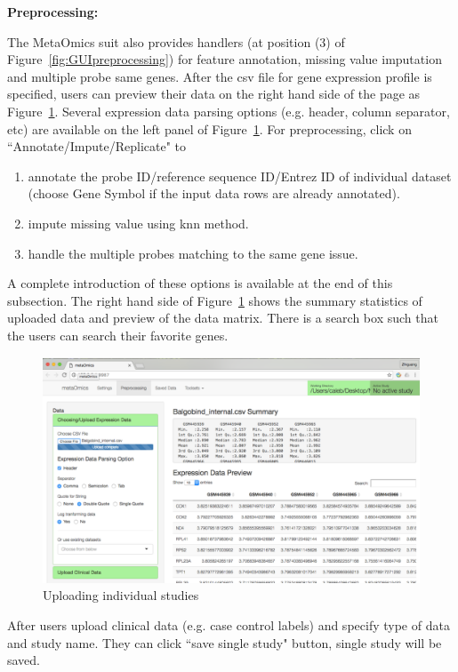 \begin{steps}
\item \textbf{Preprocessing:}

The MetaOmics suit also provides handlers (at position {\color{red} (3)} of Figure~\ref{fig:GUIpreprocessing}) for feature annotation, missing value imputation and multiple probe same genes.
After the csv file for gene expression profile is specified, 
users can preview their data on the right hand side of the page as Figure~\ref{fig:GUIpreview}.
Several expression data parsing options (e.g. header, column separator, etc) are available on the left panel of Figure~\ref{fig:GUIpreview}.
For preprocessing, 
click on ``Annotate/Impute/Replicate" to 
\begin{enumerate}
\item annotate the probe ID/reference sequence ID/Entrez ID of individual dataset (choose Gene Symbol if the input data rows are already annotated).
\item impute missing value using knn method.
\item handle the multiple probes matching to the same gene issue.
\end{enumerate}

A complete introduction of these options is available at the end of this subsection.
The right hand side of Figure~\ref{fig:GUIpreview} shows the summary statistics of uploaded data and preview of the data matrix.
There is a search box such that the users can search their favorite genes.

\begin{figure}[H]
\begin{center}
\includegraphics[scale=0.7]{./figure/preprocessing/GUIpreview}
\caption{Uploading individual studies}
\label{fig:GUIpreview}
\end{center}
\end{figure}
After users upload clinical data (e.g. case control labels) and specify type of data and study name.
They can click ``save single study" button, single study will be saved.


\end{steps}

